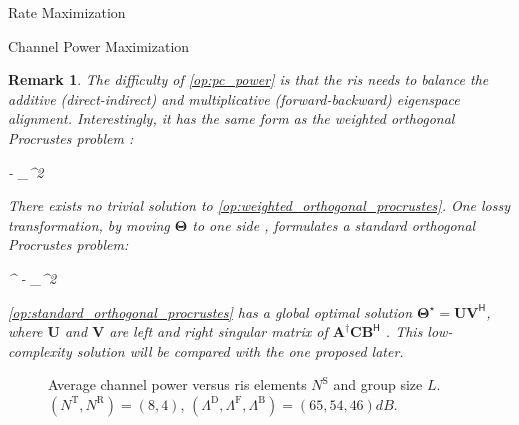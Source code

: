 \documentclass[journal]{IEEEtran}
\newtheorem{remark}{Remark}
\begin{document}
\begin{section}{Rate Maximization}
\begin{subsection}{Channel Power Maximization}
		\begin{remark}
			The difficulty of \eqref{op:pc_power} is that the \gls{ris} needs to balance the additive (direct-indirect) and multiplicative (forward-backward) eigenspace alignment.
			Interestingly, it has the same form as the \emph{weighted orthogonal Procrustes problem} \cite{Gower2004}:
			\begin{mini!}
				{\scriptstyle{\mathbf{\Theta}}}{\lVert {} -  \rVert _^2}{\label{op:weighted_orthogonal_procrustes}}{}
			\end{mini!}
			There exists no trivial solution to \eqref{op:weighted_orthogonal_procrustes}.
			One lossy transformation, by moving $\mathbf{\Theta}$ to one side \cite{Bell2003}, formulates a standard orthogonal Procrustes problem:
			\begin{mini!}
				{\scriptstyle{\mathbf{\Theta}}}{\lVert {}^\dagger {} -  \rVert _^2}{\label{op:standard_orthogonal_procrustes}}{}
				\addConstraint{\mathbf{\Theta}^\mathsf{H} \mathbf{\Theta}=\mathbf{I}.}{}{}
			\end{mini!}
			\eqref{op:standard_orthogonal_procrustes} has a global optimal solution $\mathbf{\Theta}^\star = \mathbf{U} \mathbf{V}^\mathsf{H}$, where $\mathbf{U}$ and $\mathbf{V}$ are left and right singular matrix of $\mathbf{\mathbf{A}^\dagger \mathbf{C} \mathbf{B}^\mathsf{H}}$ \cite{Golub2013}.
			This low-complexity solution will be compared with the one proposed later.
		\end{remark}

		\begin{figure}[!t]
			\centering
			\resizebox{0.65\columnwidth}{!}{
				
			}
			\caption{Average channel power versus \gls{ris} elements $N^\mathrm{S}$ and group size $L$. $(N^\mathrm{T}, N^\mathrm{R}) = (8, 4)$, $(\Lambda^\mathrm{D}, \Lambda^\mathrm{F}, \Lambda^\mathrm{B}) = (65, 54, 46) \unit{dB}$.}
			\label{sm:pc_power_sx}
		\end{figure}


\end{subsection}
\end{section}
\end{document}
